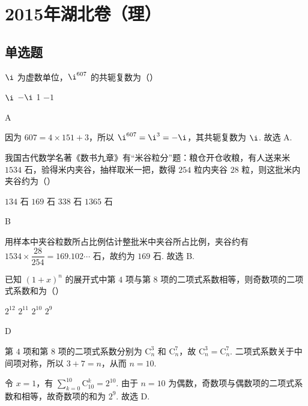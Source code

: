 \chapter{2015年湖北卷（理）}

\section{单选题}

\begin{problem}
\(\i\) 为虚数单位，\(\i^{607}\) 的共轭复数为（\quad）

\choices
    {\(\i\)}
    {\(-\i\)}
    {1}
    {\(-1\)}
\end{problem}

\begin{answer}
A
\end{answer}

\begin{solution}
因为 \(607=4\times151+3\)，所以 \(\i^{607}=\i^3=-\i\)，其共轭复数为 \(\i\). 故选 A.
\end{solution}

\begin{problem}
我国古代数学名著《数书九章》有“米谷粒分”题：粮仓开仓收粮，有人送来米 \(1534\) 石，验得米内夹谷，抽样取米一把，数得 \(254\) 粒内夹谷 \(28\) 粒，则这批米内夹谷约为（\quad）

\choices
    {\(134\) 石}
    {\(169\) 石}
    {\(338\) 石}
    {\(1365\) 石}
\end{problem}

\begin{answer}
B
\end{answer}

\begin{solution}
用样本中夹谷粒数所占比例估计整批米中夹谷所占比例，夹谷约有
\(1534\times\dfrac{28}{254}=169.102\cdots\) 石，故约为 \(169\) 石. 故选 B.
\end{solution}

\begin{problem}
已知 \((1+x)^n\) 的展开式中第 \(4\) 项与第 \(8\) 项的二项式系数相等，则奇数项的二项式系数和为（\quad）

\choices
    {\(2^{12}\)}
    {\(2^{11}\)}
    {\(2^{10}\)}
    {\(2^9\)}
\end{problem}

\begin{answer}
D
\end{answer}

\begin{solution}
第 \(4\) 项和第 \(8\) 项的二项式系数分别为 \(\mathrm C_n^3\) 和 \(\mathrm C_n^7\)，故
\(\mathrm C_n^3=\mathrm C_n^7\). 二项式系数关于中间项对称，所以 \(3+7=n\)，从而 \(n=10\).

令 \(x=1\)，有
\(\sum_{k=0}^{10}\mathrm C_{10}^k=2^{10}\). 由于 \(n=10\) 为偶数，奇数项与偶数项的二项式系数和相等，故奇数项的和为 \(2^9\). 故选 D.
\end{solution}

